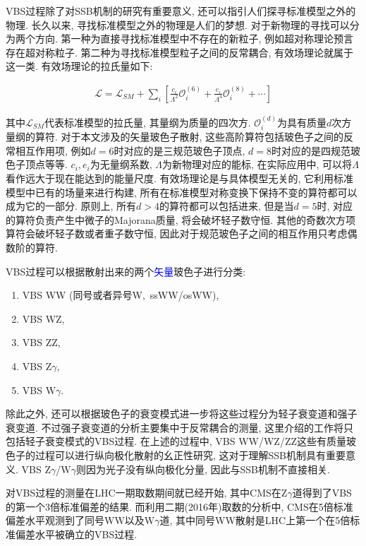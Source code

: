 \documentclass{SCIS2020cn}
\newcommand{\Wboson}{\text{W}}
\newcommand{\Zboson}{\text{Z}}
\newcommand{\add}{\textcolor{blue}}
\begin{document}
VBS过程除了对SSB机制的研究有重要意义, 还可以指引人们探寻标准模型之外的物理. 长久以来, 寻找标准模型之外的物理是人们的梦想. 对于新物理的寻找可以分为两个方向. 第一种为直接寻找标准模型中不存在的新粒子, 例如超对称理论预言存在超对称粒子. 第二种为寻找标准模型粒子之间的反常耦合, 有效场理论就属于这一类. 有效场理论的拉氏量如下: 

\begin{align}
\mathcal{L}=\mathcal{L}_{S M}+\sum_i\left[\frac{c_{i}}{\Lambda^{2}} \mathcal{O}_{i}^{(6)}+\frac{e_{i}}{\Lambda^{4}} \mathcal{O}_{i}^{(8)}+\cdots\right]
\end{align}

其中$\mathcal{L}_{S M}$代表标准模型的拉氏量, 其量纲为质量的四次方. $\mathcal{O}_{i}^{(d)}$为具有质量$d$次方量纲的算符. 对于本文涉及的矢量玻色子散射, 这些高阶算符包括玻色子之间的反常相互作用项, 例如$d=6$时对应的是三规范玻色子顶点, $d=8$时对应的是四规范玻色子顶点等等. $c_i,e_i$为无量纲系数, $\Lambda$为新物理对应的能标, 在实际应用中, 可以将$\Lambda$看作远大于现在能达到的能量尺度. 有效场理论是与具体模型无关的, 它利用标准模型中已有的场量来进行构建, 所有在标准模型对称变换下保持不变的算符都可以成为它的一部分. 原则上, 所有$d>4$的算符都可以包括进来, 但是当$d=5$时, 对应的算符负责产生中微子的Majorana质量, 将会破坏轻子数守恒. 其他的奇数次方项算符会破坏轻子数或者重子数守恒, 因此对于规范玻色子之间的相互作用只考虑偶数阶的算符. 

VBS过程可以根据散射出来的两个\add{矢量}玻色子进行分类: 

\begin{enumerate}
\def\labelenumi{\arabic{enumi}.}
\item VBS WW (同号或者异号W,\ ssWW/osWW),
\item VBS WZ,
\item VBS ZZ,
\item VBS $\Zboson\gamma$,
\item VBS $\Wboson\gamma$.
\end{enumerate}

除此之外, 还可以根据玻色子的衰变模式进一步将这些过程分为轻子衰变道和强子衰变道. 不过强子衰变道的分析主要集中于反常耦合的测量, 这里介绍的工作将只包括轻子衰变模式的VBS过程. 在上述的过程中, VBS WW/WZ/ZZ这些有质量玻色子的过程可以进行纵向极化散射的幺正性研究, 这对于理解SSB机制具有重要意义. VBS $\Zboson\gamma$/$\Wboson\gamma$则因为光子没有纵向极化分量, 因此与SSB机制不直接相关. 

对VBS过程的测量在LHC一期取数期间就已经开始, 其中CMS在$\Zboson\gamma$道得到了VBS的第一个3倍标准偏差的结果. 而利用二期(2016年)取数的分析中, CMS在5倍标准偏差水平观测到了同号WW以及$\Wboson\gamma$道, 其中同号WW散射是LHC上第一个在5倍标准偏差水平被确立的VBS过程. 
\end{document}
